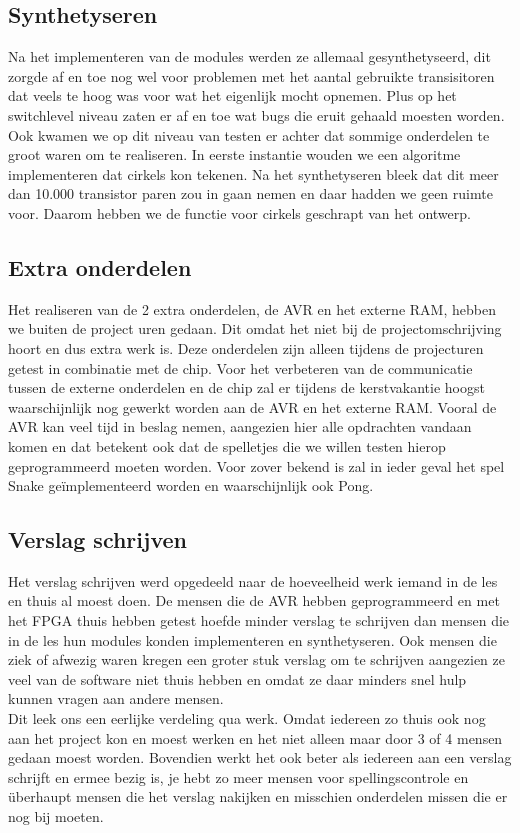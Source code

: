 \documentclass{scrartcl} %
\begin{document}
\subsection{Synthetyseren}

Na het implementeren van de modules werden ze allemaal gesynthetyseerd, dit zorgde af en toe nog wel voor problemen met het aantal gebruikte transisitoren dat veels te hoog was voor wat het eigenlijk mocht opnemen. Plus op het switchlevel niveau zaten er af en toe 
wat bugs die eruit gehaald moesten worden. Ook kwamen we op dit niveau van testen er achter dat sommige onderdelen te groot waren om te realiseren. In eerste instantie wouden we een algoritme implementeren dat cirkels kon tekenen. Na het synthetyseren bleek dat dit 
meer dan 10.000 transistor paren zou in gaan nemen en daar hadden we geen ruimte voor. Daarom hebben we de functie voor cirkels geschrapt van het ontwerp.


\subsection{Extra onderdelen}

Het realiseren van de 2 extra onderdelen, de AVR en het externe RAM, hebben we buiten de project uren gedaan. Dit omdat het niet bij de projectomschrijving hoort en dus extra werk is. Deze onderdelen zijn alleen tijdens de projecturen getest in combinatie met de chip. Voor het verbeteren van de communicatie tussen de externe onderdelen en de chip zal er tijdens de kerstvakantie hoogst waarschijnlijk nog gewerkt worden aan de AVR en het externe RAM. Vooral de AVR kan veel tijd in beslag nemen, aangezien hier alle opdrachten vandaan komen en dat betekent ook dat de spelletjes die we willen testen hierop geprogrammeerd moeten worden. Voor zover bekend is zal in ieder geval het spel Snake geïmplementeerd worden en waarschijnlijk ook Pong.

\subsection{Verslag schrijven}

Het verslag schrijven werd opgedeeld naar de hoeveelheid werk iemand in de les en thuis al moest doen. De mensen die de AVR hebben geprogrammeerd en met het FPGA thuis hebben getest hoefde minder verslag te schrijven dan mensen die in de les hun modules konden
implementeren en synthetyseren. Ook mensen die ziek of afwezig waren kregen een groter stuk verslag om te schrijven aangezien ze veel van de software niet thuis hebben en omdat ze daar minders snel hulp kunnen vragen aan andere mensen.\\
Dit leek ons een eerlijke verdeling qua werk. Omdat iedereen zo thuis ook nog aan het project kon en moest werken en het niet alleen maar door 3 of 4 mensen gedaan moest worden. Bovendien werkt het ook beter als iedereen aan een verslag schrijft en ermee bezig is, je hebt zo meer mensen voor spellingscontrole en überhaupt mensen die het verslag nakijken en misschien onderdelen missen die er nog bij moeten.
\end{document}
